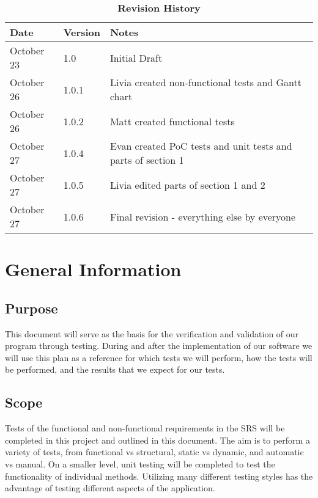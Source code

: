 \begin{table}[H]
\caption{\bf Revision History}
\begin{tabularx}{\textwidth}{p{3cm}p{2cm}X}
\toprule {\bf Date} & {\bf Version} & {\bf Notes}\\
\midrule
October 23 & 1.0 & Initial Draft\\
October 26 & 1.0.1 & Livia created non-functional tests and Gantt chart\\
October 26 & 1.0.2 & Matt created functional tests \\
October 27 & 1.0.4 & Evan created PoC tests and unit tests and parts of section 1\\
October 27 & 1.0.5 & Livia edited parts of section 1 and 2\\
October 27 & 1.0.6 & Final revision - everything else by everyone\\
\bottomrule
\end{tabularx}
\end{table}

\newpage


\section{General Information}

\subsection{Purpose}
This document will serve as the basis for the verification and validation of our program through testing. During and after the implementation of our software we will use this plan as a reference for which tests we will perform, how the tests will be performed, and the results that we expect for our tests.

\subsection{Scope}
Tests of the functional and non-functional requirements in the SRS will be completed in this project and outlined in this document. The aim is to perform a variety of tests, from functional vs structural, static vs dynamic, and automatic vs manual. On a smaller level, unit testing will be completed to test the functionality of individual methods. Utilizing many different testing styles has the advantage of testing different aspects of the application. 

